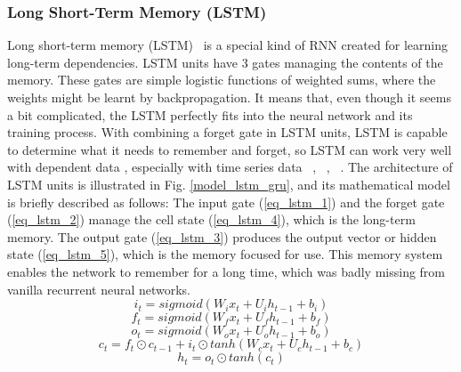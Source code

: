 \documentclass[a4paper,13pt,2p]{report}
\begin{document}
\subsubsection{Long Short-Term Memory (LSTM)}
	Long short-term memory (LSTM)~\cite{hochreiter1997long} is a special kind of RNN created for learning long-term dependencies. LSTM units have 3 gates managing the contents of the memory. These gates are simple logistic functions of weighted sums, where the weights might be learnt by backpropagation. It means that, even though it seems a bit complicated, the LSTM perfectly fits into the neural network and its training process. With combining a forget gate in LSTM units, LSTM is capable to determine what it needs to remember and forget, so LSTM can work very well with dependent data , especially with time series data ~\cite{gers2002applying}, ~\cite{guo2016robust}, ~\cite{fu2016using}. The architecture of LSTM units is illustrated in Fig. \ref{model_lstm_gru}, and its mathematical model is briefly described as follows:
	 The input gate (\ref{eq_lstm_1}) and the forget gate (\ref{eq_lstm_2}) manage the cell state (\ref{eq_lstm_4}), which is the long-term memory. The output gate (\ref{eq_lstm_3}) produces the output vector or hidden state (\ref{eq_lstm_5}), which is the memory focused for use. This memory system enables the network to remember for a long time, which was badly missing from vanilla recurrent neural networks. 
\begin{equation}\label{eq_lstm_1}
i_t = sigmoid(W_ix_t + U_ih_{t-1}+b_i)
\end{equation}
\begin{equation}\label{eq_lstm_2}
f_t = sigmoid(W_fx_t + U_fh_{t-1}+b_f)
\end{equation}
\begin{equation}\label{eq_lstm_3}
o_t = sigmoid(W_ox_t + U_oh_{t-1}+b_o)
\end{equation}
\begin{equation}\label{eq_lstm_4}
c_t = f_t \odot c_{t-1} + i_t \odot tanh(W_cx_t + U_ch_{t-1} + b_c)
\end{equation}
\begin{equation}\label{eq_lstm_5}
h_t = o_t \odot tanh(c_t)
\end{equation}
\end{document}
